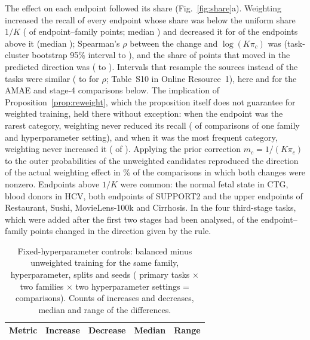 \documentclass[pdflatex,sn-mathphys-ay]{sn-jnl}
\theoremstyle{thmstyleone}
\theoremstyle{thmstylethree}
\begin{document}
The effect on each endpoint followed its share (Fig.~\ref{fig:share}a). Weighting increased the recall of every endpoint whose share was below the uniform share $1/K$ (\EpWBelowPos{} of \EpWBelowN{} endpoint--family points; median \EpWBelowMed{}) and decreased it for \EpWAboveNeg{} of the \EpWAboveN{} endpoints above it (median \EpWAboveMed{}); Spearman's $\rho$ between the change and $\log(K\pi_c)$ was \EpWRho{} (task-cluster bootstrap 95\% interval \EpWRhoLo{} to \EpWRhoHi{}), and the share of points that moved in the predicted direction was \EpWAgr{} (\EpWAgrLo{} to \EpWAgrHi{}). Intervals that resample the \NSourcesRule{} sources instead of the tasks were similar (\EpWRhoLoS{} to \EpWRhoHiS{} for $\rho$; Table~S10 in Online Resource~1), here and for the AMAE and stage-4 comparisons below. The implication of Proposition~\ref{prop:reweight}, which the proposition itself does not guarantee for weighted training, held there without exception: when the endpoint was the rarest category, weighting never reduced its recall (\PcRarestOk{} of \PcRarestN{} comparisons of one family and hyperparameter setting), and when it was the most frequent category, weighting never increased it (\PcFreqOk{} of \PcFreqN{}). Applying the prior correction $m_c=1/(K\pi_c)$ to the outer probabilities of the unweighted candidates reproduced the direction of the actual weighting effect in \PcAgreePct{}\% of the \PcAgreeN{} comparisons in which both changes were nonzero. Endpoints above $1/K$ were common: the normal fetal state in CTG, blood donors in HCV, both endpoints of SUPPORT2 and the upper endpoints of Restaurant, Sushi, MovieLens-100k and Cirrhosis. In the four third-stage tasks, which were added after the first two stages had been analysed, \SThreeWCons{} of the \SThreeWN{} endpoint--family points changed in the direction given by the rule.

\begin{table}[t]
\caption{Fixed-hyperparameter controls: balanced minus unweighted training for the same family, hyperparameter, splits and seeds (\NPrimary{} primary tasks $\times$ two families $\times$ two hyperparameter settings = \CtrlN{} comparisons). Counts of increases and decreases, median and range of the differences.}\label{tab:controls}
\centering\footnotesize
\begin{tabular}{@{}lrrrr@{}}
\toprule
Metric & Increase & Decrease & Median & Range\\
\midrule

\bottomrule
\end{tabular}
\end{table}
\end{document}
